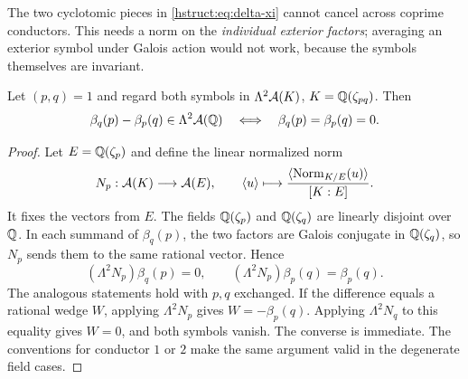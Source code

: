 The two cyclotomic pieces in \eqref{hstruct:eq:delta-xi} cannot cancel across
coprime conductors. This needs a norm on the \emph{individual exterior
factors}; averaging an exterior symbol under Galois action would not work,
because the symbols themselves are invariant.

\begin{lemma}\label{hstruct:lem:norm}
Let $(p,q)=1$ and regard both symbols in
$\Lambda^2\mathcal A(K)$, $K=\mathbb{Q}(\zeta_{pq})$. Then
\begin{equation}\label{hstruct:eq:norm-separate}
 \beta_q(p)-\beta_p(q)\in\Lambda^2\mathcal A(\mathbb{Q})
 \quad\Longleftrightarrow\quad
 \beta_q(p)=\beta_p(q)=0.
\end{equation}
\end{lemma}
\begin{proof}
Let $E=\mathbb{Q}(\zeta_p)$ and define the linear normalized norm
\[
 N_p:\mathcal A(K)\longrightarrow\mathcal A(E),\qquad
 \langle u\rangle\longmapsto\frac{\langle \operatorname{Norm}_{K/E}(u)\rangle}{[K:E]}.
\]
It fixes the vectors from $E$. The fields $\mathbb{Q}(\zeta_p)$ and
$\mathbb{Q}(\zeta_q)$ are linearly disjoint over $\mathbb{Q}$. In each summand of
$\beta_q(p)$, the two factors are Galois conjugate in $\mathbb{Q}(\zeta_q)$,
so $N_p$ sends them to the same rational vector. Hence
\[
 (\Lambda^2N_p)\beta_q(p)=0,
 \qquad(\Lambda^2N_p)\beta_p(q)=\beta_p(q).
\]
The analogous statements hold with $p,q$ exchanged. If the difference
equals a rational wedge $W$, applying $\Lambda^2N_p$ gives
$W=-\beta_p(q)$. Applying $\Lambda^2N_q$ to this equality gives $W=0$,
and both symbols vanish. The converse is immediate. The conventions
for conductor $1$ or $2$ make the same argument valid in the degenerate
field cases.
\end{proof}

